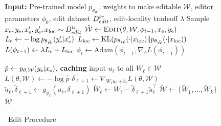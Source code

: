 \documentclass{article}
\begin{document}
\begin{figure}
\begin{minipage}[t]{0.42\textwidth}
\begin{algorithm}[H]
\caption{\name~Training}\label{alg:edit-procedure}
\begin{algorithmic}[1]
\State \textbf{Input:} Pre-trained model $p_{\theta_\mathcal{W}}$, weights to make editable $\mathcal{W}$, editor parameters $\phi_0$, edit dataset $D^{tr}_{edit}$, edit-locality tradeoff $\lambda$
    \State Sample $x_\text{e},y_\text{e},x_\text{e}',y_\text{e}',x_\text{loc}\sim D^{tr}_{edit}$
    \State $\mathcal{\tilde W} \gets \textsc{Edit}(\theta,\mathcal{W},\phi_{t-1},x_\text{e},y_\text{e})$
    \State $L_\text{e} \gets -\log p_{\theta_\mathcal{\tilde W}}(y_\text{e}'|x_\text{e}')$
    \State $L_\text{loc} \gets \text{KL}(p_{\theta_\mathcal{W}}(\cdot|x_\text{loc}) \| p_{\theta_\mathcal{\tilde W}}(\cdot|x_\text{loc}))$
    \State $L(\phi_{t-1}) \gets \lambda L_\text{e} + L_\text{loc}$
    \State $\phi_t \gets \text{Adam}\left(\phi_{t-1}, \nabla_\phi L(\phi_{t-1})\right)$
\EndFor
\end{algorithmic}\end{algorithm}\end{minipage} \hfill%
%
%
%
\begin{minipage}[t]{0.56\textwidth}
\begin{algorithm}[H]
\caption{\name~Edit Procedure}\label{alg:training}
\begin{algorithmic}[1]
    \State $\hat{p} \gets p_{\theta,\mathcal{W}}(y_\text{e}|x_\text{e})$, \textbf{caching} input $u_\ell$ to all $W_\ell\in\mathcal{W}$
    \State $L(\theta, \mathcal{W})\gets -\log \hat{p}$ 
        \State $\delta_{\ell+1} \gets \nabla_{W_\ell u_\ell + b_\ell} L(\theta, \mathcal{W})$ 
        \State $\tilde u_\ell,\tilde\delta_{\ell+1} \gets g_{\phi_\ell}(u_\ell,\delta_{\ell+1})$ 
        \State $\tilde W_\ell \gets W_\ell - \tilde\delta_{\ell+1}\tilde u_\ell^{\top}$ 
    \EndFor
    \State $\mathcal{\tilde{W}} \gets \{\tilde W_1,...,\tilde W_k\}$
    \State \Return $\mathcal{\tilde{W}}$ 
\EndProcedure
\end{algorithmic}\end{algorithm}\end{minipage}
\end{figure}
\end{document}
